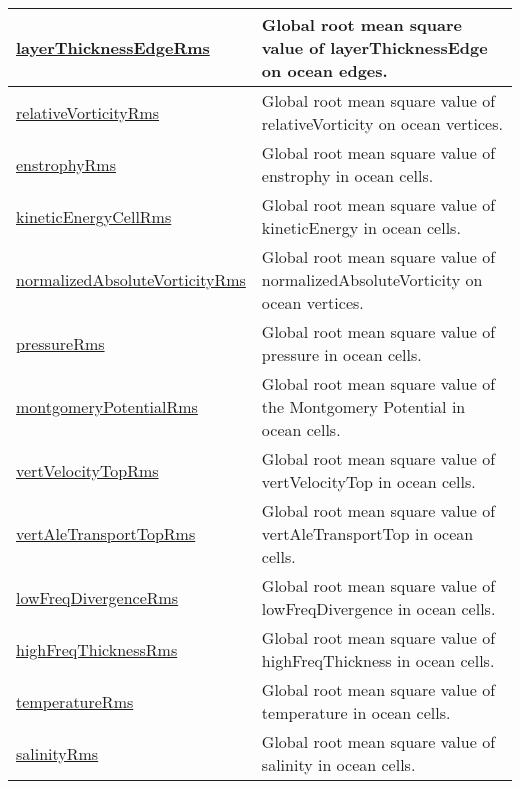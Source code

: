 {\begin{center}
\begin{longtable}{| p{2.0in} | p{4.0in} |}
    \hline
    \hyperref[subsec:var_sec_globalStatsAM_layerThicknessEdgeRms]{layerThicknessEdgeRms} & Global root mean square value of layerThicknessEdge on ocean edges. \\
    \hline
    \hyperref[subsec:var_sec_globalStatsAM_relativeVorticityRms]{relativeVorticityRms} & Global root mean square value of relativeVorticity on ocean vertices. \\
    \hline
    \hyperref[subsec:var_sec_globalStatsAM_enstrophyRms]{enstrophyRms} & Global root mean square value of enstrophy in ocean cells. \\
    \hline
    \hyperref[subsec:var_sec_globalStatsAM_kineticEnergyCellRms]{kineticEnergyCellRms} & Global root mean square value of kineticEnergy in ocean cells. \\
    \hline
    \hyperref[subsec:var_sec_globalStatsAM_normalizedAbsoluteVorticityRms]{normalizedAbsoluteVorticityRms} & Global root mean square value of normalizedAbsoluteVorticity on ocean vertices. \\
    \hline
    \hyperref[subsec:var_sec_globalStatsAM_pressureRms]{pressureRms} & Global root mean square value of pressure in ocean cells. \\
    \hline
    \hyperref[subsec:var_sec_globalStatsAM_montgomeryPotentialRms]{montgomeryPotentialRms} & Global root mean square value of the Montgomery Potential in ocean cells. \\
    \hline
    \hyperref[subsec:var_sec_globalStatsAM_vertVelocityTopRms]{vertVelocityTopRms} & Global root mean square value of vertVelocityTop in ocean cells. \\
    \hline
    \hyperref[subsec:var_sec_globalStatsAM_vertAleTransportTopRms]{vertAleTransportTopRms} & Global root mean square value of vertAleTransportTop in ocean cells. \\
    \hline
    \hyperref[subsec:var_sec_globalStatsAM_lowFreqDivergenceRms]{lowFreqDivergenceRms} & Global root mean square value of lowFreqDivergence in ocean cells. \\
    \hline
    \hyperref[subsec:var_sec_globalStatsAM_highFreqThicknessRms]{highFreqThicknessRms} & Global root mean square value of highFreqThickness in ocean cells. \\
    \hline
    \hyperref[subsec:var_sec_globalStatsAM_temperatureRms]{temperatureRms} & Global root mean square value of temperature in ocean cells. \\
    \hline
    \hyperref[subsec:var_sec_globalStatsAM_salinityRms]{salinityRms} & Global root mean square value of salinity in ocean cells. \\

\end{longtable}
\end{center}}
